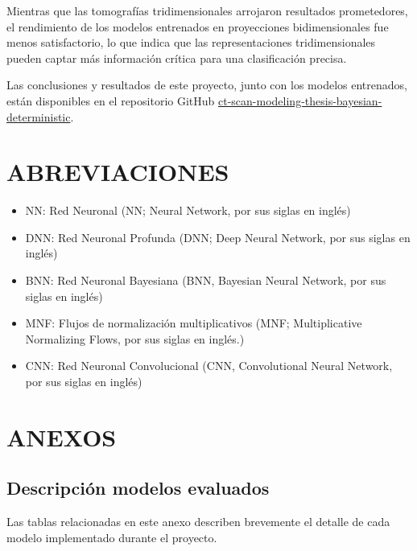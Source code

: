 \documentclass[10pt, oneside, a4paper]{article}
\begin{document}
	Mientras que las tomografías tridimensionales arrojaron resultados prometedores, el rendimiento de los modelos entrenados en proyecciones bidimensionales fue menos satisfactorio, lo que indica que las representaciones tridimensionales pueden captar más información crítica para una clasificación precisa.

	Las conclusiones y resultados de este proyecto, junto con los modelos entrenados, están disponibles en el repositorio GitHub \href{https://github.com/juanfierro94/ct-scan-modeling-thesis-bayesian-deterministic}{ct-scan-modeling-thesis-bayesian-deterministic}.

		
	\newpage	
	
	
	
	\newpage
	\section{ABREVIACIONES}
	
	\begin{itemize}
		\item NN: Red Neuronal (NN; Neural Network, por sus siglas en inglés) 
		\item DNN: Red Neuronal Profunda (DNN; Deep Neural Network, por sus siglas en inglés)
		\item BNN: Red Neuronal Bayesiana (BNN, Bayesian Neural Network, por sus siglas en inglés)
		\item MNF: Flujos de normalización multiplicativos (MNF; Multiplicative Normalizing Flows, por sus siglas en inglés.)
		\item CNN: Red Neuronal Convolucional (CNN, Convolutional Neural Network, por sus siglas en inglés)
	\end{itemize}
	
	\newpage
	
	\appendix
	\section{ANEXOS}


	\subsection{Descripción modelos evaluados} \label{anexo_tabla_modelos}
	
	Las tablas relacionadas en este anexo describen brevemente el detalle de cada modelo implementado durante el proyecto.
	
\end{document}
